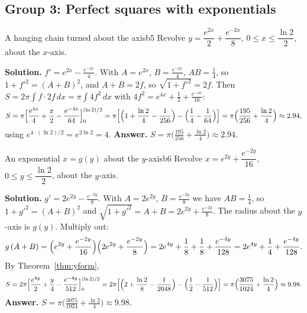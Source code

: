 \documentclass[11pt]{article}
\begin{document}
\subsection*{Group 3: Perfect squares with exponentials}

\begin{exmp}{A hanging chain turned about the axis}{b5}
Revolve $y=\dfrac{e^{2x}}2+\dfrac{e^{-2x}}8$, $0\le x\le\dfrac{\ln2}2$, about the $x$-axis.

\textbf{Solution.} $f'=e^{2x}-\frac{e^{-2x}}4$. With $A=e^{2x}$, $B=\frac{e^{-2x}}4$, $AB=\frac14$, so $1+f'^2=(A+B)^2$, and $A+B=2f$, so $\sqrt{1+f'^2}=2f$. Then $S=2\pi\int f\cdot2f\,dx=\pi\int4f^2\,dx$ with $4f^2=e^{4x}+\frac12+\frac{e^{-4x}}{16}$:
\[
S=\pi\Bigl[\frac{e^{4x}}4+\frac x2-\frac{e^{-4x}}{64}\Bigr]_0^{(\ln2)/2}=\pi\Bigl[\Bigl(1+\frac{\ln2}4-\frac1{256}\Bigr)-\Bigl(\frac14-\frac1{64}\Bigr)\Bigr]=\pi\Bigl(\frac{195}{256}+\frac{\ln2}4\Bigr)\approx2.94 ,
\]
using $e^{4\cdot(\ln2)/2}=e^{2\ln2}=4$.
\textbf{Answer.} $S=\pi\bigl(\frac{195}{256}+\frac{\ln2}4\bigr)\approx2.94$.
\end{exmp}

\begin{exmp}{An exponential $x=g(y)$ about the $y$-axis}{b6}
Revolve $x=e^{2y}+\dfrac{e^{-2y}}{16}$, $0\le y\le\dfrac{\ln2}2$, about the $y$-axis.

\textbf{Solution.} $g'=2e^{2y}-\frac{e^{-2y}}8$. With $A=2e^{2y}$, $B=\frac{e^{-2y}}8$ we have $AB=\frac14$, so $1+g'^2=(A+B)^2$ and $\sqrt{1+g'^2}=A+B=2e^{2y}+\frac{e^{-2y}}8$. The radius about the $y$-axis is $g(y)$. Multiply out:
\[
g\,(A+B)=\Bigl(e^{2y}+\frac{e^{-2y}}{16}\Bigr)\Bigl(2e^{2y}+\frac{e^{-2y}}8\Bigr)=2e^{4y}+\frac18+\frac18+\frac{e^{-4y}}{128}=2e^{4y}+\frac14+\frac{e^{-4y}}{128}.
\]
By Theorem~\ref{thm:yform},
\[
S=2\pi\Bigl[\frac{e^{4y}}2+\frac y4-\frac{e^{-4y}}{512}\Bigr]_0^{(\ln2)/2}=2\pi\Bigl[\Bigl(2+\frac{\ln2}8-\frac1{2048}\Bigr)-\Bigl(\frac12-\frac1{512}\Bigr)\Bigr]=\pi\Bigl(\frac{3075}{1024}+\frac{\ln2}4\Bigr)\approx9.98 .
\]
\textbf{Answer.} $S=\pi\bigl(\frac{3075}{1024}+\frac{\ln2}4\bigr)\approx9.98$.
\end{exmp}
\end{document}
